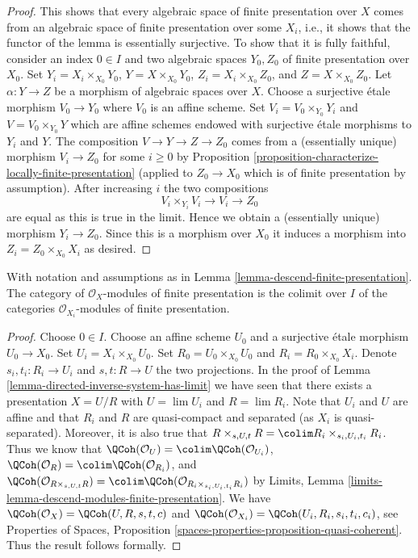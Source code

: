 \begin{proof}
\medskip\noindent
This shows that every algebraic space of finite presentation over $X$ comes
from an algebraic space of finite presentation over some $X_i$, i.e.,
it shows that the functor of the lemma is essentially surjective. To
show that it is fully faithful, consider an index $0 \in I$ and two
algebraic spaces $Y_0, Z_0$ of finite presentation over $X_0$.
Set $Y_i = X_i \times_{X_0} Y_0$, $Y = X \times_{X_0} Y_0$,
$Z_i = X_i \times_{X_0} Z_0$, and $Z = X \times_{X_0} Z_0$. Let
$\alpha : Y \to Z$ be a morphism of algebraic spaces over $X$.
Choose a surjective \'etale morphism $V_0 \to Y_0$ where $V_0$ is
an affine scheme. Set $V_i = V_0 \times_{Y_0} Y_i$ and
$V = V_0 \times_{Y_0} Y$ which are affine schemes endowed with
surjective \'etale morphisms to $Y_i$ and $Y$. The composition
$V \to Y \to Z \to Z_0$ comes from a (essentially unique) morphism
$V_i \to Z_0$ for some $i \geq 0$ by
Proposition \ref{proposition-characterize-locally-finite-presentation}
(applied to $Z_0 \to X_0$ which is of finite presentation by assumption).
After increasing $i$ the two compositions
$$
V_i \times_{Y_i} V_i \to V_i \to Z_0
$$
are equal as this is true in the limit. Hence we obtain a (essentially unique)
morphism $Y_i \to Z_0$. Since this is a morphism over $X_0$
it induces a morphism into $Z_i = Z_0 \times_{X_0} X_i$ as desired.
\end{proof}

\begin{lemma}
\label{lemma-descend-modules-finite-presentation}
With notation and assumptions as in
Lemma \ref{lemma-descend-finite-presentation}.
The category of $\mathcal{O}_X$-modules of finite presentation is the
colimit over $I$ of the categories $\mathcal{O}_{X_i}$-modules of finite
presentation.
\end{lemma}

\begin{proof}
Choose $0 \in I$. Choose an affine scheme $U_0$ and a surjective
\'etale morphism $U_0 \to X_0$. Set $U_i = X_i \times_{X_0} U_0$.
Set $R_0 = U_0 \times_{X_0} U_0$ and $R_i = R_0 \times_{X_0} X_i$.
Denote $s_i, t_i : R_i \to U_i$ and $s, t : R \to U$ the two
projections. In the proof of
Lemma \ref{lemma-directed-inverse-system-has-limit} we have
seen that there exists a presentation $X = U/R$ with
$U = \lim U_i$ and $R = \lim R_i$. Note that $U_i$ and $U$ are affine and
that $R_i$ and $R$ are quasi-compact and separated (as $X_i$ is
quasi-separated). Moreover, it is also true that
$R \times_{s, U, t} R = \colim R_i \times_{s_i, U_i, t_i} R_i$.
Thus we know that
$\QCoh(\mathcal{O}_U) = \colim \QCoh(\mathcal{O}_{U_i})$,
$\QCoh(\mathcal{O}_R) = \colim \QCoh(\mathcal{O}_{R_i})$,
and
$\QCoh(\mathcal{O}_{R \times_{s, U, t} R}) =
\colim \QCoh(\mathcal{O}_{R_i \times_{s_i, U_i, t_i} R_i})$ by
Limits, Lemma \ref{limits-lemma-descend-modules-finite-presentation}.
We have $\QCoh(\mathcal{O}_X) = \QCoh(U, R, s, t, c)$ and
$\QCoh(\mathcal{O}_{X_i}) = \QCoh(U_i, R_i, s_i, t_i, c_i)$,
see Properties of Spaces, Proposition
\ref{spaces-properties-proposition-quasi-coherent}.
Thus the result follows formally.
\end{proof}

